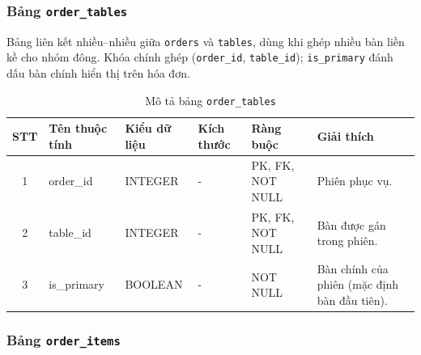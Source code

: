 \documentclass[../DoAn.tex]{subfiles}
\begin{document}
\subsubsection{Bảng \texttt{order\_tables}}

Bảng liên kết nhiều--nhiều giữa \texttt{orders} và \texttt{tables}, dùng khi ghép nhiều bàn liền kề cho nhóm đông.
Khóa chính ghép (\texttt{order\_id}, \texttt{table\_id}); \texttt{is\_primary} đánh dấu bàn chính hiển thị trên hóa đơn.

\begin{table}[H]
\centering
\renewcommand{\arraystretch}{1.3}
\small
\begin{tabularx}{\textwidth}{|c|>{\RaggedRight\arraybackslash}p{2.9cm}|>{\Centering\arraybackslash}p{2.2cm}|>{\Centering\arraybackslash}p{1.3cm}|>{\Centering\arraybackslash}p{2.2cm}|>{\RaggedRight\arraybackslash}X|}
\hline
\textbf{STT} & \textbf{Tên thuộc tính} & \textbf{Kiểu dữ liệu} & \textbf{Kích thước} & \textbf{Ràng buộc} & \textbf{Giải thích} \\
\hline
1 & order\_id & INTEGER & - & PK, FK, NOT NULL & Phiên phục vụ. \\ \hline
2 & table\_id & INTEGER & - & PK, FK, NOT NULL & Bàn được gán trong phiên. \\ \hline
3 & is\_primary & BOOLEAN & - & NOT NULL & Bàn chính của phiên (mặc định bàn đầu tiên). \\ \hline
\end{tabularx}
\caption{Mô tả bảng \texttt{order\_tables}}
\end{table}

\subsubsection{Bảng \texttt{order\_items}}
\end{document}
